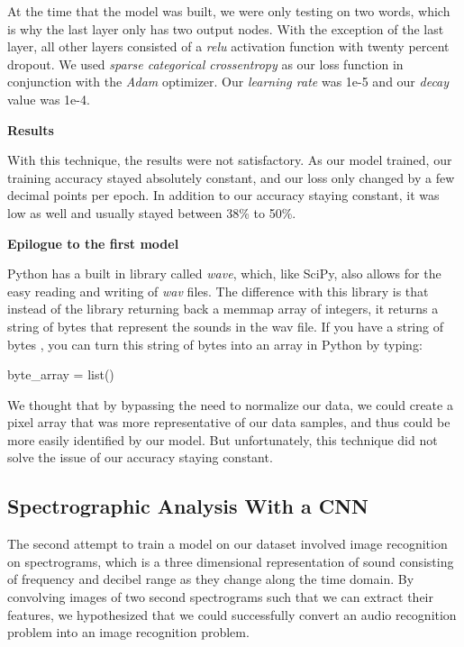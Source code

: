 \documentclass[12pt,journal,compsoc]{IEEEtran}
\begin{document}
At the time that the model was built, we were only testing on two words, which is why the last layer only has two output nodes. With the exception of the last layer, all other layers consisted of a \textit{relu} activation function with twenty percent dropout. We used \textit{sparse categorical crossentropy} as our loss function in conjunction with the \textit{Adam} optimizer. Our \textit{learning rate} \textalpha \vspace{10 mm} was 1e-5 and our \textit{decay} value was 1e-4. 

\begin{center}
	\textbf{Results}
\end{center}

With this technique, the results were not satisfactory. As our model trained, our training accuracy stayed absolutely constant, and our loss only changed by a few decimal points per epoch. In addition to our accuracy staying constant, it was low as well and usually stayed between 38\% to 50\%. 

\begin{center}
	\textbf{Epilogue to the first model}
\end{center}

Python has a built in library called \textit{wave}, which, like SciPy, also allows for the easy reading and writing of \textit{wav} files. The difference with this library is that instead of the library returning back a memmap array of integers, it returns a string of bytes that represent the sounds in the wav file. If you have a string of bytes \textit{\textbeta}, you can turn this string of bytes into an array in Python by typing:

\begin{center}
	byte\_array = list(\textbeta)
\end{center}

We thought that by bypassing the need to normalize our data, we could create a pixel array that was more representative of our data samples, and thus could be more easily identified by our model. But unfortunately, this technique did not solve the issue of our accuracy staying constant. 

\subsection{Spectrographic Analysis With a CNN}

The second attempt to train a model on our dataset involved image recognition on spectrograms, which is a three dimensional representation of sound consisting of frequency and decibel range as they change along the time domain. By convolving images of two second spectrograms such that we can extract their features, we hypothesized that we could successfully convert an audio recognition problem into an image recognition problem. 
\end{document}
